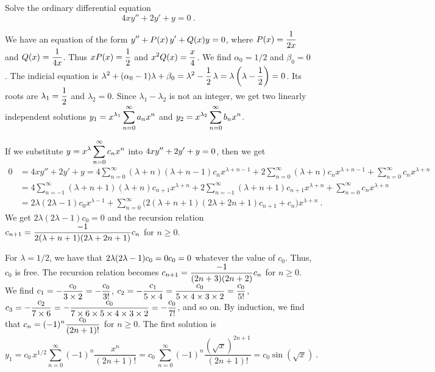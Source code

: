\begin{egg}
Solve the ordinary differential equation
\[
4xy''+ 2 y' + y = 0 \ .
\]

We have an equation of the form
$\displaystyle y'' + P(x)\, y' + Q(x) y = 0$, where
$\displaystyle P(x) = \frac{1}{2x}$ and
$\displaystyle Q(x) = \frac{1}{4x}$.
Thus $\displaystyle x P(x) = \frac{1}{2}$ and
$\displaystyle x^2 Q(x) = \frac{x}{4}$.  We find
$\alpha_0 = 1/2$ and $\beta_0= 0$.  The indicial equation is
$\displaystyle \lambda^2 + (\alpha_0 - 1)\lambda + \beta_0 = \lambda^2
-\frac{1}{2}\,\lambda  = \lambda \left(\lambda -\frac{1}{2}\right) = 0$.
Its roots are $\displaystyle \lambda_1 = \frac{1}{2}$ and $\lambda_2=0$.
Since $\lambda_1-\lambda_2$ is not an integer, we get two linearly
independent solutions
$\displaystyle y_1 = x^{\lambda_1} \sum_{n=0}^\infty a_n x^n$
and $\displaystyle y_2 = x^{\lambda_2} \sum_{n=0}^\infty b_n x^n$.

If we substitute $\displaystyle y = x^\lambda \sum_{n=0}^\infty c_n x^n$ into
$\displaystyle 4xy''+ 2 y' + y = 0$, then we get
\begin{align*}
0 & = 4xy''+ 2 y' + y
= 4 \sum_{n=0}^\infty (\lambda+n)(\lambda+n-1) c_n
x^{\lambda+n-1} + 2 \sum_{n=0}^\infty (\lambda + n )c_n x^{\lambda+n-1}
+ \sum_{n=0}^\infty c_n x^{\lambda+n} \\
&= 4 \sum_{n=-1}^\infty (\lambda+n+1)(\lambda+n) c_{n+1}
x^{\lambda+n} + 2 \sum_{n=-1}^\infty (\lambda + n+1 )c_{n+1} x^{\lambda+n}
+ \sum_{n=0}^\infty c_n x^{\lambda+n} \\
&=  2\lambda(2\lambda-1) c_0 x^{\lambda-1} + \sum_{n=0}^\infty \big(
2(\lambda+n+1)(2\lambda+2n +1)c_{n+1} +c_n\big) x^{\lambda+n} \ .
\end{align*}
We get $2\lambda( 2\lambda -1)c_0 = 0$ and the recursion relation
$\displaystyle c_{n+1} = \frac{-1}{2(\lambda+n+1)(2\lambda+2n+1)} c_n$
for $n\geq 0$.

For $\lambda = 1/2$, we have that
$\displaystyle 2\lambda( 2\lambda -1)c_0 = 0 c_0 = 0$ whatever the
value of $c_0$.  Thus, $c_0$ is free.  The recursion relation becomes
$\displaystyle c_{n+1} = \frac{-1}{(2n+3)(2n+2)} c_n$
for $n \geq 0$.  We find
$\displaystyle c_1 = -\frac{c_0}{3\times 2} = - \frac{c_0}{3!}$,
$\displaystyle c_2 = - \frac{c_1}{5\times 4}
= \frac{c_0}{5\times 4 \times 3 \times 2} = \frac{c_0}{5!}$,
$\displaystyle c_3 = - \frac{c_2}{7\times 6}
= -\frac{c_0}{7\times 6\times 5\times 4 \times 3 \times 2} = - \frac{c_0}{7!}$,
and so on.  By induction, we find that
$\displaystyle c_n = (-1)^n \frac{c_0}{(2n+1)!}$ for $n \geq 0$.
The first solution is
\[
y_1 = c_0 \, x^{1/2} \sum_{n=0}^\infty (-1)^n \frac{x^n}{(2n+1)!}
= c_0 \, \sum_{n=0}^\infty (-1)^n \frac{(\sqrt{x})^{2n+1}}{(2n+1)!}
= c_0 \sin(\sqrt{x}) \ .
\]


\end{egg}
